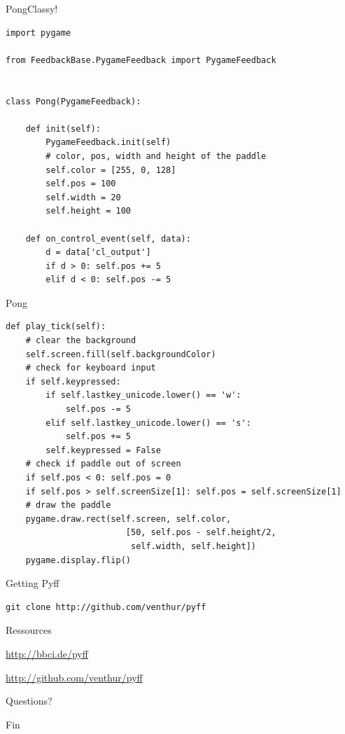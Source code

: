 \documentclass{beamer}
\begin{document}
\begin{frame}[fragile]{Pong}{Classy!}
    \begin{lstlisting}[tiny]
import pygame

from FeedbackBase.PygameFeedback import PygameFeedback


class Pong(PygameFeedback):

    def init(self):
        PygameFeedback.init(self)
        # color, pos, width and height of the paddle
        self.color = [255, 0, 128]
        self.pos = 100
        self.width = 20
        self.height = 100

    def on_control_event(self, data):
        d = data['cl_output']
        if d > 0: self.pos += 5
        elif d < 0: self.pos -= 5
    \end{lstlisting}
\end{frame}

\begin{frame}[fragile]{Pong}
    \begin{lstlisting}
def play_tick(self):
    # clear the background
    self.screen.fill(self.backgroundColor)
    # check for keyboard input
    if self.keypressed:
        if self.lastkey_unicode.lower() == 'w':
            self.pos -= 5
        elif self.lastkey_unicode.lower() == 's':
            self.pos += 5
        self.keypressed = False
    # check if paddle out of screen
    if self.pos < 0: self.pos = 0
    if self.pos > self.screenSize[1]: self.pos = self.screenSize[1]
    # draw the paddle
    pygame.draw.rect(self.screen, self.color,
                        [50, self.pos - self.height/2,
                         self.width, self.height])
    pygame.display.flip()
    \end{lstlisting}
\end{frame}


\begin{frame}[fragile]{Getting Pyff}
    \begin{lstlisting}[bash]
git clone http://github.com/venthur/pyff
    \end{lstlisting}
\end{frame}

\begin{frame}{Ressources}
    \begin{description}[xxxxxxxxxxxxxxx]
        \item[Pyff Homepage] \url{http://bbci.de/pyff}
        \item[git Repository] \url{http://github.com/venthur/pyff}
    \end{description}
\end{frame}

\begin{frame}[plain]
    \begin{center}
        \huge{Questions?}
    \end{center}
\end{frame}

\begin{frame}[plain]
    \begin{center}
        \huge{Fin}
    \end{center}
\end{frame}
\end{document}
